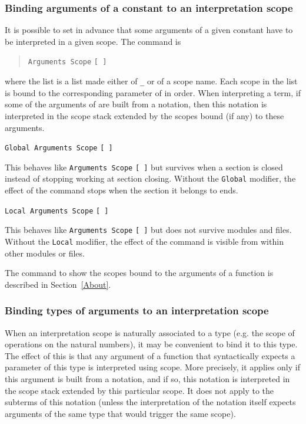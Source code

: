 \subsubsection{Binding arguments of a constant to an interpretation scope
}

It is possible to set in advance that some arguments of a given
constant have to be interpreted in a given scope. The command is
\begin{quote}
{\tt Arguments Scope} {\qualid} {\tt [ \nelist{\optscope}{} ]}
\end{quote}
where the list is a list made either of {\tt \_} or of a scope name.
Each scope in the list is bound to the corresponding parameter of
{\qualid} in order.  When interpreting a term, if some of the
arguments of {\qualid} are built from a notation, then this notation
is interpreted in the scope stack extended by the scopes bound (if any)
to these arguments.

\begin{Variants}
\item {\tt Global Arguments Scope} {\qualid} {\tt [ \nelist{\optscope}{} ]}

This behaves like {\tt Arguments Scope} {\qualid} {\tt [
\nelist{\optscope}{} ]} but survives when a section is closed instead
of stopping working at section closing. Without the {\tt Global} modifier,
the effect of the command stops when the section it belongs to ends.

\item {\tt Local Arguments Scope} {\qualid} {\tt [ \nelist{\optscope}{} ]}

This behaves like {\tt Arguments Scope} {\qualid} {\tt [
    \nelist{\optscope}{} ]} but does not survive modules and files.
Without the {\tt Local} modifier, the effect of the command is
visible from within other modules or files.

\end{Variants}


\SeeAlso The command to show the scopes bound to the arguments of a
function is described in Section~\ref{About}.

\subsubsection{Binding types of arguments to an interpretation scope}

When an interpretation scope is naturally associated to a type
(e.g. the scope of operations on the natural numbers), it may be
convenient to bind it to this type. The effect of this is that any
argument of a function that syntactically expects a parameter of this
type is interpreted using scope. More precisely, it applies only if
this argument is built from a notation, and if so, this notation is
interpreted in the scope stack extended by this particular scope.  It
does not apply to the subterms of this notation (unless the
interpretation of the notation itself expects arguments of the same
type that would trigger the same scope).

